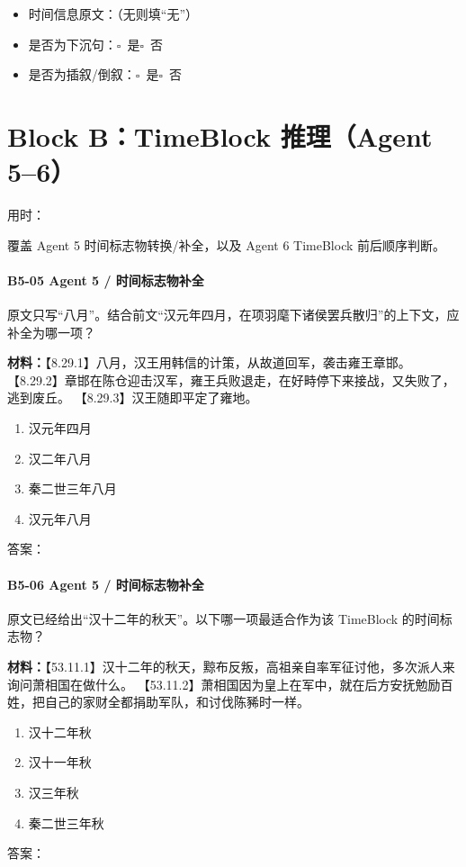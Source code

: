 \documentclass[fontset=none,11pt,a4paper]{ctexart}
\newcommand{\answerline}[1]{\underline{\hspace{#1}}}
\newcommand{\choicebox}[1]{$\square$~#1}
\newcommand{\blocktime}{\vspace{0.25em}\noindent 用时：\answerline{4cm}\par\vspace{0.6em}}
\begin{document}
\begin{itemize}
  \item 时间信息原文：\answerline{7.5cm}（无则填“无”）
  \item 是否为下沉句：\choicebox{是}\quad \choicebox{否}
  \item 是否为插叙/倒叙：\choicebox{是}\quad \choicebox{否}
\end{itemize}


\newpage
\section{Block B：TimeBlock 推理（Agent 5--6）}
\blocktime
覆盖 Agent 5 时间标志物转换/补全，以及 Agent 6 TimeBlock 前后顺序判断。

\paragraph{B5-05 \quad Agent 5 / 时间标志物补全}
原文只写“八月”。结合前文“汉元年四月，在项羽麾下诸侯罢兵散归”的上下文，应补全为哪一项？


\textbf{材料：}【8.29.1】八月，汉王用韩信的计策，从故道回军，袭击雍王章邯。 【8.29.2】章邯在陈仓迎击汉军，雍王兵败退走，在好畤停下来接战，又失败了，逃到废丘。 【8.29.3】汉王随即平定了雍地。


\begin{enumerate}[label=\Alph*.]
  \item 汉元年四月
  \item 汉二年八月
  \item 秦二世三年八月
  \item 汉元年八月
\end{enumerate}
答案：\answerline{2.2cm}

\paragraph{B5-06 \quad Agent 5 / 时间标志物补全}
原文已经给出“汉十二年的秋天”。以下哪一项最适合作为该 TimeBlock 的时间标志物？


\textbf{材料：}【53.11.1】汉十二年的秋天，黥布反叛，高祖亲自率军征讨他，多次派人来询问萧相国在做什么。 【53.11.2】萧相国因为皇上在军中，就在后方安抚勉励百姓，把自己的家财全都捐助军队，和讨伐陈豨时一样。


\begin{enumerate}[label=\Alph*.]
  \item 汉十二年秋
  \item 汉十一年秋
  \item 汉三年秋
  \item 秦二世三年秋
\end{enumerate}
答案：\answerline{2.2cm}
\end{document}
